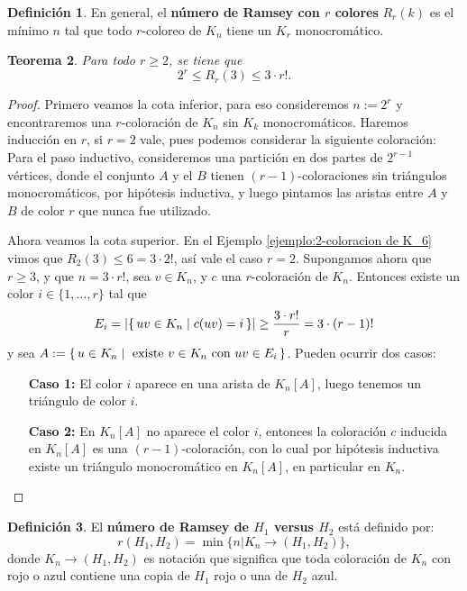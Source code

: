 \documentclass[12pt]{report}
\theoremstyle{plain}
\newtheorem{theorem}{Teorema}[section]
\theoremstyle{definition}
\newtheorem{definition}[theorem]{Definición}
\newcommand{\abs}[1]{\left \vert #1 \right \vert}
\begin{document}
\begin{definition}
En general, el \textbf{número de Ramsey con $r$ colores} $R_r (k)$ es el mínimo $n$ tal que todo $r$-coloreo de $K_n$ tiene un $K_r$ monocromático.
\end{definition}

\begin{theorem}
Para todo $r \geq 2$, se tiene que
\[
    2^r \leq R_r (3) \leq 3 \cdot r!.
\]
\end{theorem}
\begin{proof}
Primero veamos la cota inferior, para eso consideremos $n:= 2^r$ y encontraremos una $r$-coloración de $K_n$ sin $K_k$ monocromáticos. Haremos inducción en $r$, si $r = 2$ vale, pues podemos considerar la siguiente coloración:
Para el paso inductivo, consideremos una partición en dos partes de $2^{r-1}$ vértices, donde el conjunto $A$ y el $B$ tienen $(r-1)$-coloraciones sin triángulos monocromáticos, por hipótesis inductiva, y luego pintamos las aristas entre $A$ y $B$ de color $r$ que nunca fue utilizado.

Ahora veamos la cota superior. En el Ejemplo \ref{ejemplo:2-coloracion de K_6} vimos que $R_2(3) \leq 6 = 3 \cdot 2 !$, así vale el caso $r = 2$. Supongamos ahora que $r \geq 3$, y que $n = 3 \cdot r!$, sea $v \in K_n$, y $c$ una $r$-coloración de $K_n$. Entonces existe un color $i \in  \{1, \ldots, r\}$ tal que
\[
    E_i = \abs{\set{uv \in K_n | c (uv) = i}} \geq \frac{3 \cdot r !}{r} = 3 \cdot (r-1)!
\]
y sea $A := \set{u \in K_n | \text{ existe $v \in K_n$ con } u v \in E_i}$. Pueden ocurrir dos casos:
\begin{enumerate}
\item[\textbf{Caso 1:}] El color $i$ aparece en una arista de $K_n [A]$, luego tenemos un triángulo de color $i$.
\item[\textbf{Caso 2:}] En $K_n [A]$ no aparece el color $i$, entonces la coloración $c$ inducida en $K_n [A]$ es una $(r-1)$-coloración, con lo cual por hipótesis inductiva existe un triángulo monocromático en $K_n [A]$, en particular en $K_n$.
\end{enumerate}
\end{proof}


\begin{definition}
El \textbf{número de Ramsey de $H_1$ versus $H_2$} está definido por:
\[
    r(H_1, H_2) = \min \{ n | K_n \to (H_1, H_2)\},
\]
donde $K_n \to (H_1, H_2)$ es notación que significa que toda coloración de $K_n$ con rojo o azul contiene una copia de $H_1$ rojo o una de $H_2$ azul.
\end{definition}
\end{document}
